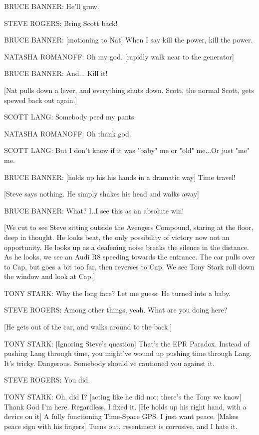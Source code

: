 BRUCE BANNER: He'll grow.

STEVE ROGERS: Bring Scott back!

BRUCE BANNER: [motioning to Nat] When I say kill the power, kill the power.

NATASHA ROMANOFF: Oh my god. [rapidly walk near to the generator]

BRUCE BANNER: And... Kill it!

[Nat pulls down a lever, and everything shuts down. Scott, the normal Scott, gets spewed back out again.]

SCOTT LANG: Somebody peed my pants.

NATASHA ROMANOFF: Oh thank god.

SCOTT LANG: But I don't know if it was "baby" me or "old" me...Or just "me" me.

BRUCE BANNER: [holds up his his hands in a dramatic way] Time travel!

[Steve says nothing. He simply shakes his head and walks away]

BRUCE BANNER: What? I..I see this as an absolute win!

[We cut to see Steve sitting outside the Avengers Compound, staring at the floor, deep in thought. He looks beat, the only possibility of victory now not an opportunity. He looks up as a deafening noise breaks the silence in the distance. As he looks, we see an Audi R8 speeding towards the entrance. The car pulls over to Cap, but goes a bit too far, then reverses to Cap. We see Tony Stark roll down the window and look at Cap.]

TONY STARK: Why the long face? Let me guess: He turned into a baby.

STEVE ROGERS: Among other things, yeah. What are you doing here?

[He gets out of the car, and walks around to the back.]

TONY STARK: [Ignoring Steve's question] That's the EPR Paradox. Instead of pushing Lang through time, you might've wound up pushing time through Lang. It's tricky. Dangerous. Somebody should've cautioned you against it.

STEVE ROGERS: You did.

TONY STARK: Oh, did I? [acting like he did not; there's the Tony we know] Thank God I'm here. Regardless, I fixed it. [He holds up his right hand, with a device on it] A fully functioning Time-Space GPS. I just want peace. [Makes peace sign with his fingers] Turns out, resentment is corrosive, and I hate it.

